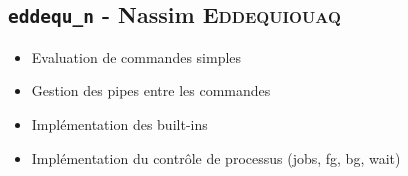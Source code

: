 \subsection{\texttt{eddequ\_n} - Nassim \textsc{Eddequiouaq}}

\begin{itemize}
    \item Evaluation de commandes simples
    \item Gestion des pipes entre les commandes
    \item Implémentation des built-ins
    \item Implémentation du contrôle de processus (jobs, fg, bg, wait)
\end{itemize}
